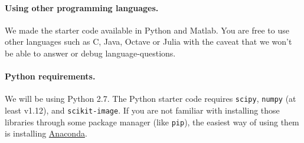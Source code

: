 \documentclass[10pt,letterpaper]{article}
\newcommand{\cmd}[1] {{\color{blue}\texttt{#1}}}
\begin{document}
\paragraph{Using other programming languages.} We made the starter code available in Python and Matlab. You are free to use other languages such as C, Java, Octave or Julia with the caveat that we won't be able to answer or debug language-questions.

\paragraph{Python requirements.} We will be using Python 2.7. The Python starter code requires \cmd{scipy}, \cmd{numpy} (at least v1.12), and \cmd{scikit-image}.
If you are not familiar with installing those libraries through some package manager (like \cmd{pip}), the easiest way of using them is installing \href{https://conda.io/docs/user-guide/install/index.html}{Anaconda}.



\newpage
\end{document}
